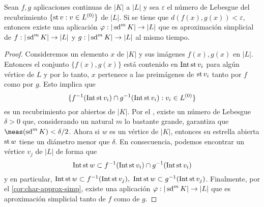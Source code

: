 \begin{lema}
	\label{lem:aprox-simpl-f-cont}
	Sean $f,g$ aplicaciones continuas de $|K|$ a $|L|$ y sea $\varepsilon$ el número de Lebesgue del recubrimiento $\{ \operatorname{st} v : v \in L^{(0)} \}$ de $|L|$. Si se tiene que $d(f(x), g(x)) < \varepsilon$, entonces existe una aplicación $\varphi : |\operatorname{sd}^m K| \to |L|$ que es aproximación simplicial de $f: |\operatorname{sd}^m K| \to |L|$ y $g: |\operatorname{sd}^m K| \to |L|$ al mismo tiempo.
\end{lema}
\begin{proof}
	Consideremos un elemento $x$ de $|K|$ y sus imágenes $f(x), g(x)$ en $|L|$. Entonces el conjunto $\{f(x),g(x)\}$ está contenido en $\operatorname{Int} \operatorname{st} v_i$ para algún vértice de $L$ y por lo tanto, $x$ pertenece a las preimágenes de $\operatorname{st} v_i$ tanto por $f$ como por $g$. Esto implica que 
	\[
		\{ f^{-1}(\operatorname{Int} \operatorname{st} v_i) \cap g^{-1}(\operatorname{Int} \operatorname{st} v_i) : v_i \in L^{(0)} \}
	\]
	es un recubrimiento por abiertos de $|K|$. Por el , existe un número de Lebesgue $\delta > 0$ que, considerando un natural $m$ lo bastante grande, garantiza que $\meas(\sd^m K) < \delta/2$. Ahora si $w$ es un vértice de $|K|$, entonces su estrella abierta $\operatorname{st} w$ tiene un diámetro menor que $\delta$. En consecuencia, podemos encontrar un vértice $v_j$ de $|L|$ de forma que
	\[
		\operatorname{Int} \operatorname{st} w \subset f^{-1}(\operatorname{Int} \operatorname{st} v_i) \cap g^{-1}(\operatorname{Int} \operatorname{st} v_i) 
	\]
	y en particular,
	$\operatorname{Int} \operatorname{st} w \subset f^{-1}(\operatorname{Int} \operatorname{st} v_j),\ \operatorname{Int} \operatorname{st} w \subset g^{-1}(\operatorname{Int} \operatorname{st} v_j)$. Finalmente, por el \autoref{cor:char-approx-simp}, existe una aplicación $\varphi : |\operatorname{sd}^m K| \to |L|$ que es aproximación simplicial tanto de $f$ como de $g$.
\end{proof}

